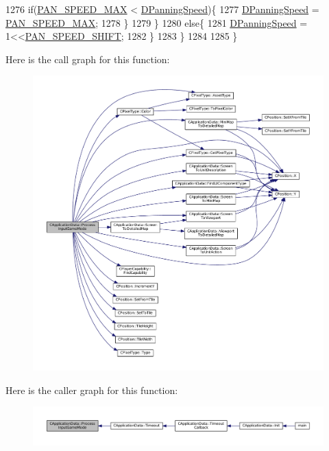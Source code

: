 \begin{DoxyCode}
1276             \textcolor{keywordflow}{if}(\hyperlink{main_8cpp_a33d410346afabd12760fec78db0663fe}{PAN\_SPEED\_MAX} < \hyperlink{classCApplicationData_a9e07e8374b20abfbb57f656e92be8404}{DPanningSpeed})\{
1277                 \hyperlink{classCApplicationData_a9e07e8374b20abfbb57f656e92be8404}{DPanningSpeed} = \hyperlink{main_8cpp_a33d410346afabd12760fec78db0663fe}{PAN\_SPEED\_MAX};
1278             \}
1279         \}
1280         \textcolor{keywordflow}{else}\{
1281             \hyperlink{classCApplicationData_a9e07e8374b20abfbb57f656e92be8404}{DPanningSpeed} = 1<<\hyperlink{main_8cpp_aaf387df20f2ed20a4ec142f9ded9e886}{PAN\_SPEED\_SHIFT};
1282         \}
1283     \}
1284     
1285 \}
\end{DoxyCode}
Here is the call graph for this function\+:\nopagebreak
\begin{figure}[H]
\begin{center}
\leavevmode
\includegraphics[width=350pt]{classCApplicationData_a018490e670662ed9a9266449516a2ac7_cgraph}
\end{center}
\end{figure}
Here is the caller graph for this function\+:\nopagebreak
\begin{figure}[H]
\begin{center}
\leavevmode
\includegraphics[width=350pt]{classCApplicationData_a018490e670662ed9a9266449516a2ac7_icgraph}
\end{center}
\end{figure}
\hypertarget{classCApplicationData_a4fb3ad6900161476b5dace2d7cf9908c}{}\label{classCApplicationData_a4fb3ad6900161476b5dace2d7cf9908c} 

